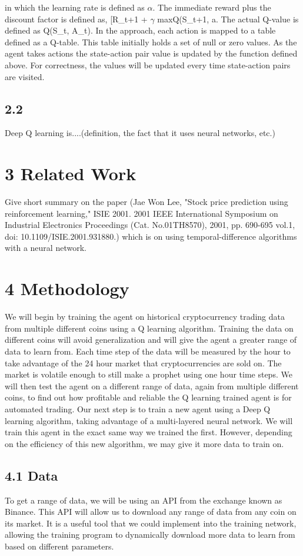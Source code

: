 \documentclass[letterpaper]{article}
\begin{document}
in which the learning rate is defined as $\alpha$. The immediate reward plus the discount factor is defined as, [R\_{t+1} + $\gamma$ maxQ(S\_{t+1, a}. The actual Q-value is defined as Q(S\_{t}, A\_{t}).
In the approach, each action is mapped to a table defined as a Q-table. This table initially holds a set of null or zero values. As the agent takes actions the state-action pair value is updated by the function defined above. For correctness, the values will be updated every time state-action pairs are visited. 

\subsection{2.2} 
Deep Q learning is....(definition, the fact that it uses neural networks, etc.)

\section{3 Related Work}
Give short summary on the paper (Jae Won Lee, "Stock price prediction using reinforcement learning," ISIE 2001. 2001 IEEE International Symposium on Industrial Electronics Proceedings (Cat. No.01TH8570), 2001, pp. 690-695 vol.1, doi: 10.1109/ISIE.2001.931880.) which is on using temporal-difference algorithms with a neural network.

\section{4 Methodology}
We will begin by training the agent on historical cryptocurrency trading data from multiple different coins using a Q learning algorithm. Training the data on different coins will avoid generalization and will give the agent a greater range of data to learn from. Each time step of the data will be measured by the hour to take advantage of the 24 hour market that cryptocurrencies are sold on. The market is volatile enough to still make a prophet using one hour time steps. We will then test the agent on a different range of data, again from multiple different coins, to find out how profitable and reliable the Q learning trained agent is for automated trading. Our next step is to train a new agent using a Deep Q learning algorithm, taking advantage of a multi-layered neural network. We will train this agent in the exact same way we trained the first. However, depending on the efficiency of this new algorithm, we may give it more data to train on.
\subsection{4.1 Data}
To get a range of data, we will be using an API from the exchange known as Binance. This API will allow us to download any range of data from any coin on its market. It is a useful tool that we could implement into the training network, allowing the training program to dynamically download more data to learn from based on different parameters.
\end{document}

